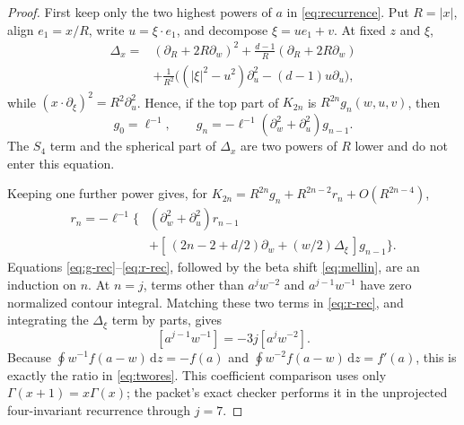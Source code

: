 \documentclass[11pt]{article}
\newcommand{\dd}{\,\mathrm d}
\begin{document}
\begin{proof}
First keep only the two highest powers of $a$ in
\eqref{eq:recurrence}.  Put $R=|x|$, align $e_1=x/R$, write
$u=\xi\cdot e_1$, and decompose $\xi=u e_1+v$.  At fixed $z$ and $\xi$,
\begin{align*}
 \Delta_x={}&(\partial_R+2R\partial_w)^2
  +\frac{d-1}{R}(\partial_R+2R\partial_w)\\
 &+\frac1{R^2}\bigl((|\xi|^2-u^2)\partial_u^2-(d-1)u\partial_u\bigr),
\end{align*}
while $(x\cdot\partial_\xi)^2=R^2\partial_u^2$.  Hence, if the top
part of $K_{2n}$ is $R^{2n}g_n(w,u,v)$, then
\begin{equation}\label{eq:g-rec}
 g_0=\ell^{-1},\qquad
 g_n=-\ell^{-1}(\partial_w^2+\partial_u^2)g_{n-1}.
\end{equation}
The $S_4$ term and the spherical part of $\Delta_x$ are two powers of $R$
lower and do not enter this equation.

Keeping one further power gives, for
$K_{2n}=R^{2n}g_n+R^{2n-2}r_n+O(R^{2n-4})$,
\begin{equation}\label{eq:r-rec}
\begin{aligned}
 r_n=-\ell^{-1}\{&(\partial_w^2+\partial_u^2)r_{n-1}\\
 &+[\,(2n-2+d/2)\partial_w+(w/2)\Delta_\xi\,]g_{n-1}\}.
\end{aligned}
\end{equation}
Equations \eqref{eq:g-rec}--\eqref{eq:r-rec}, followed by the beta shift
\eqref{eq:mellin}, are an induction on $n$.  At $n=j$, terms other than
$a^jw^{-2}$ and $a^{j-1}w^{-1}$ have zero normalized contour integral.
Matching these two terms in \eqref{eq:r-rec}, and integrating the
$\Delta_\xi$ term by parts, gives
\begin{equation}\label{eq:ratio}
 [a^{j-1}w^{-1}]= -3j[a^jw^{-2}].
\end{equation}
Because
$\oint w^{-1}f(a-w)\dd z=-f(a)$ and
$\oint w^{-2}f(a-w)\dd z=f'(a)$, this is exactly the ratio in
\eqref{eq:twores}.  This coefficient comparison uses only
$\Gamma(x+1)=x\Gamma(x)$; the packet's exact checker performs it in the
unprojected four-invariant recurrence through $j=7$.


\end{proof}
\end{document}
